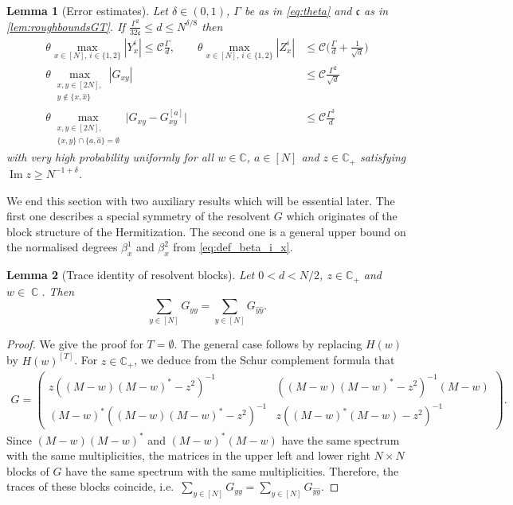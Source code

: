 \documentclass[10pt,a4paper]{amsart}
\DeclareMathOperator{\Ima}{Im}
\DeclareMathOperator{\CC}{\mathbb{C}}
\newcommand{\C}{\mathbb{C}}
\renewcommand{\Im}{\Ima}
\newtheorem{lemma}{Lemma}[section]
\numberwithin{equation}{section}
\newcommand*\bset[1]{[#1]}
\newcommand*\ubarr[1]{{\widehat{#1}}}
\begin{document}
	\begin{lemma}[Error estimates] \label{lem:roughboundsrest}
		Let $\delta \in (0,1)$,  $\Gamma$ be as in \cref{eq:theta} and $\mathfrak c$ as in \cref{lem:roughboundsGT}.  
		If $\frac{\Gamma^2}{32\mathfrak c} \leq d \leq N^{\delta/8}$ then 
		\begin{align}
		\theta \max_{x \in [N],\, i\in \{1,2\}} \left|Y^{i}_{x}\right|  \le \mathcal{C}  \frac{\Gamma}{d}, \qquad 
		\theta \max_{x \in [N],\, i\in \{1,2\}} \left|Z^{i}_{x}\right| & \le \mathcal{C} \biggl( \frac{\Gamma}{d} + \frac{1}{\sqrt{d}} \biggr) \label{eq:boundrest}\\
			\theta \max_{\substack{x,y \in [2N],\\y\notin \{x,\ubarr{x}\}}} \left|G_{xy}\right| &\le  \mathcal{C}  \frac{\Gamma^2}{\sqrt{d}} \label{eq:roughboundGd-1/2}\\
			\theta \max_{\substack{x,y \in [2N],\\ \{x,y\}\cap \{a,\ubarr{a}\} =\emptyset }} \bigl|G_{xy} - G_{xy}^{\bset{a}}\bigr| &\le  \mathcal{C}\frac{\Gamma^3}{d} \label{eq:roughdifferenceGGTd-1}
		\end{align}
		with very high probability
		uniformly for all $w \in \C$, $a \in [N]$ and $z \in \C_+$ satisfying $\Im z \geq N^{-1+\delta}$. 
	\end{lemma}

	
	We end this section with two auxiliary results which will be essential later. 
	The first one describes a special symmetry of the resolvent $G$ which originates of the block structure of the Hermitization. 
	The second one is a general upper bound on the normalised degrees $\beta_x^1$ and $\beta_x^2$ from \cref{eq:def_beta_i_x}. 
	
	\begin{lemma}[Trace identity of resolvent blocks]\label{lem:traceg1=g2}
		Let $0< d < N/2$, $z \in \C_+$ and $w \in \CC$. 
		Then
		\begin{equation*}%
			\sum_{y\in [N]} G_{yy} = \sum_{y\in [N]} G_{\ubarr{y} \ubarr{y}}.
		\end{equation*}
	\end{lemma}
	
	\begin{proof}
		We give the proof for $T= \emptyset$. The general case follows by replacing $H(w)$ by $H(w)^{\bset{T}}$. For $z \in \C_+$, we deduce from the Schur complement formula that 
		\begin{align*}
			G 	= \begin{pmatrix} z((M-w)(M-w)^*-z^2)^{-1} & ((M-w)(M-w)^*-z^2)^{-1}(M-w) \\ 
			(M-w)^*((M-w)(M-w)^*-z^2)^{-1} 
			& z((M-w)^* (M-w)-z^2)^{-1} 
			\end{pmatrix} . 
		\end{align*}
		Since $\left(M - w \right)\left(M - w \right)^\ast$ and $\left(M - w \right)^\ast\left(M - w \right)$ have the same spectrum with the same multiplicities, the matrices in the upper left and lower right $N\times N$ blocks of $G$ have the same spectrum with the same multiplicities.
		Therefore, the traces of these blocks coincide, i.e.\ $\sum_{y \in [N]} G_{yy}  = \sum_{y \in [N]} G_{\ubarr{y}\ubarr{y}}$. 
	\end{proof}
	
\end{document}
